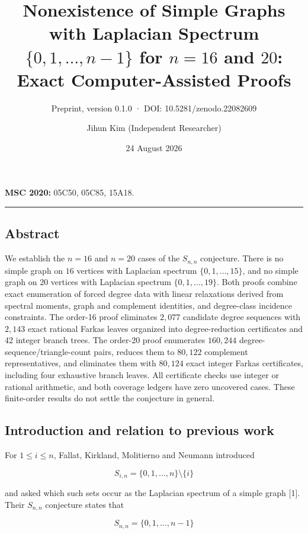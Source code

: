 \documentclass[
  english,
  11pt,
  a4paper,
]{article}
\title{Nonexistence of Simple Graphs with Laplacian Spectrum
\(\{0,1,\ldots,n-1\}\) for \(n=16\) and \(20\): Exact Computer-Assisted
Proofs}
\subtitle{Preprint, version 0.1.0 · DOI: 10.5281/zenodo.22082609}
\author{Jihun Kim (Independent Researcher)}
\date{24 August 2026}
\begin{document}
\maketitle

\textbf{MSC 2020:} 05C50, 05C85, 15A18.

\begin{center}\rule{0.5\linewidth}{0.5pt}\end{center}

\subsection{Abstract}\label{abstract}

We establish the \(n=16\) and \(n=20\) cases of the \(S_{n,n}\)
conjecture. There is no simple graph on \(16\) vertices with Laplacian
spectrum \(\{0,1,\ldots,15\}\), and no simple graph on \(20\) vertices
with Laplacian spectrum \(\{0,1,\ldots,19\}\). Both proofs combine exact
enumeration of forced degree data with linear relaxations derived from
spectral moments, graph and complement identities, and degree-class
incidence constraints. The order-16 proof eliminates \(2{,}077\)
candidate degree sequences with \(2{,}143\) exact rational Farkas leaves
organized into degree-reduction certificates and 42 integer branch
trees. The order-20 proof enumerates \(160{,}244\)
degree-sequence/triangle-count pairs, reduces them to \(80{,}122\)
complement representatives, and eliminates them with \(80{,}124\) exact
integer Farkas certificates, including four exhaustive branch leaves.
All certificate checks use integer or rational arithmetic, and both
coverage ledgers have zero uncovered cases. These finite-order results
do not settle the conjecture in general.

\clearpage
\setcounter{tocdepth}{2}
\tableofcontents
\clearpage

\subsection{Introduction and relation to previous
work}\label{introduction-and-relation-to-previous-work}

For \(1\le i\le n\), Fallat, Kirkland, Molitierno and Neumann introduced

\[
S_{i,n}=\{0,1,\ldots,n\}\setminus\{i\}
\]

and asked which such sets occur as the Laplacian spectrum of a simple
graph {[}1{]}. Their \(S_{n,n}\) conjecture states that

\[
S_{n,n}=\{0,1,\ldots,n-1\}
\]
\end{document}
